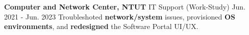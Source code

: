 \begin{cventries}
  \cventry
    {} 
    {\textbf{Computer and Network Center, NTUT} \textbar{} \textmd{IT Support (Work-Study)}} 
    {Jun. 2021 - Jun. 2023} 
    {} 
{
      \vspace{-1mm} 
     \hspace*{1mm} \textbullet \hspace*{1.2mm} {Troubleshoted \textbf{network/system} issues, provisioned \textbf{OS environments}, and \textbf{redesigned} the Software Portal UI/UX.}%
    }

\end{cventries}